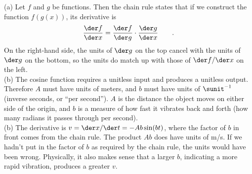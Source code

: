 (a) Let $f$ and $g$ be functions. Then the chain rule states that if we construct the function $f(g(x))$, its derivative is
\begin{equation*}
  \frac{\der f}{\der x} = \frac{\der f}{\der g} \cdot \frac{\der g}{\der x} \qquad .
\end{equation*}
On the right-hand side, the units of $\der g$ on the top cancel with the units of
$\der g$ on the bottom, so the units do match up with those of $\der f/\der x$ on the left.\\
(b) The cosine function requires a unitless input and produces a unitless output. Therefore
$A$ must have units of meters, and $b$ must have units of $\sunit^{-1}$ (inverse seconds, or ``per second'').
$A$ is the distance the object moves on either side of the origin, and $b$ is a measure of how fast it vibrates
back and forth (how many radians it passes through per second).\\
(b) The derivative is $v=\der x/\der t=-Ab\sin(bt)$, where the factor of $b$ in front comes
from the chain rule. The product $Ab$ does have units of m/s. If we hadn't put in the factor
of $b$ as required by the chain rule, the units would have been wrong. Physically, it also makes sense
that a larger $b$, indicating a more rapid vibration, produces a greater $v$.




